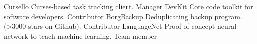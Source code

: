 



\begin{cvhonors2}

  \cvhonor
    {Cursello} %
    {Curses-based task tracking client.} %
    {\href{https://github.com/TBurchfield/cursello}{\faGithubSquare\acvHeaderIconSep\@Cursello}} %
    {Manager} %
  \cvhonor
    {DevKit} %
    {Core code toolkit for software developers.} %
    {\href{https://github.com/dsmith47/devkit}{\faGithubSquare\acvHeaderIconSep\@DevKit}} %
    {Contributor} %
  \cvhonor
    {BorgBackup} %
    {Deduplicating backup program.  (>3000 stars on Github).} %
    {\href{https://github.com/borgbackup/borg}{\faGithubSquare\acvHeaderIconSep\@BorgBackup}} %
    {Contributor} %
  \cvhonor
    {LanguageNet} %
    {Proof of concept neural network to teach machine learning.} %
    {\href{https://github.com/noyoshi/language-nn-matlab}{\faGithubSquare\acvHeaderIconSep\@LanguageNet}} %
    {Team member} %

\end{cvhonors2}

